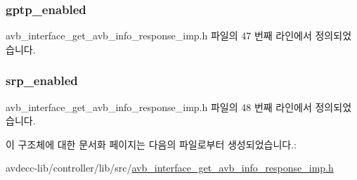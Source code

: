 \subsubsection[{\texorpdfstring{gptp\+\_\+enabled}{gptp_enabled}}]{ gptp\+\_\+enabled}\hypertarget{structavdecc__lib_1_1avb__interface__get__avb__info__response__imp_1_1avb__interface__get__avb__info__flags_a01986b6f39f06dd3834c80df38992489}{}\label{structavdecc__lib_1_1avb__interface__get__avb__info__response__imp_1_1avb__interface__get__avb__info__flags_a01986b6f39f06dd3834c80df38992489}


avb\+\_\+interface\+\_\+get\+\_\+avb\+\_\+info\+\_\+response\+\_\+imp.\+h 파일의 47 번째 라인에서 정의되었습니다.

\subsubsection[{\texorpdfstring{srp\+\_\+enabled}{srp_enabled}}]{ srp\+\_\+enabled}\hypertarget{structavdecc__lib_1_1avb__interface__get__avb__info__response__imp_1_1avb__interface__get__avb__info__flags_af400e9eca233fc22a73a4b5624f6a5e8}{}\label{structavdecc__lib_1_1avb__interface__get__avb__info__response__imp_1_1avb__interface__get__avb__info__flags_af400e9eca233fc22a73a4b5624f6a5e8}


avb\+\_\+interface\+\_\+get\+\_\+avb\+\_\+info\+\_\+response\+\_\+imp.\+h 파일의 48 번째 라인에서 정의되었습니다.



이 구조체에 대한 문서화 페이지는 다음의 파일로부터 생성되었습니다.\+:\begin{DoxyCompactItemize}
\item 
avdecc-\/lib/controller/lib/src/\hyperlink{avb__interface__get__avb__info__response__imp_8h}{avb\+\_\+interface\+\_\+get\+\_\+avb\+\_\+info\+\_\+response\+\_\+imp.\+h}\end{DoxyCompactItemize}
